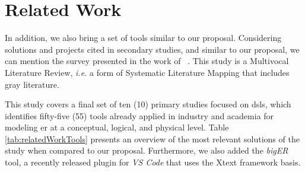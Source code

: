 \section{Related Work} \label{sec_slm:relatedWork}

In addition, we also bring a set of tools similar to our proposal.
Considering solutions and projects cited in secondary studies, and similar to our proposal, we can mention the survey presented in the work of ~\cite{eres:2021}.
This study is a Multivocal Literature Review, \textit{i.e.} a form of Systematic Literature Mapping that includes gray literature.

This study covers a final set of ten (10) primary studies focused on \acp{dsl}, which identifies fifty-five (55) tools already applied in industry and academia for modeling \ac{er} at a conceptual, logical, and physical level.
Table \ref{tab:relatedWorkTools}  presents an overview of the most relevant solutions of the study when compared to our proposal.
Furthermore, we also added the \textit{bigER} tool, a recently released plugin for \textit{VS Code} that uses the Xtext framework basis.

